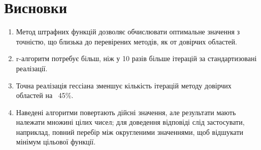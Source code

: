 \documentclass[12pt]{report}
\begin{document}
    \section*{Висновки}

    \begin{enumerate}
        \item Метод штрафних функцій дозволяє обчислювати оптимальне значення з точністю, що близька до перевірених
        методів, як от довірчих областей.
        \item r-алгоритм потребує більш, ніж у 10 разів більше ітерацій за стандартизовані реалізації.
        \item Точна реалізація гессіана зменшує кількість ітерацій методу довірчих областей на ~45\%.
        \item Наведені алгоритми повертають дійсні значення, але результати мають належати множині цілих чисел; для
        доведення відповіді слід застосувати, наприклад, повний перебір між округленими значеннями, щоб відшукати
        мінімум цільової функції.
    \end{enumerate}
\end{document}
